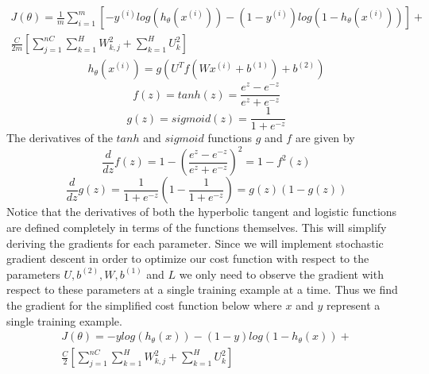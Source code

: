 \documentclass{article}
\begin{document}
\begin{equation}
\begin{split}
J(\theta) = \frac{1}{m} \sum_{i=1}^m \left[-y ^{(i)} log(h_{\theta}(x^{(i)}))-(1-y^{(i)})log(1-h_{\theta}(x^{(i)}))\right]+\\ \frac{C}{2m} \left[ \sum_{j=1}^{nC} \sum_{k=1}^H W_{k,j}^2 + \sum_{k=1}^H U_{k}^2\right]
\end{split}
\end{equation}
\begin{equation}
\begin{split}
h_{\theta}(x^{(i)}) = g\left(U^Tf\left(Wx^{(i)}+b^{(1)}\right)+b^{(2)}\right)
\end{split}
\end{equation}
\begin{equation}
f(z) = tanh(z) = \frac{e^z - e^{-z}}{e^z + e^{-z}}
\end{equation}
\begin{equation}
g(z) = sigmoid(z) = \frac{1}{1+e^{-z}}
\end{equation}
The derivatives of the \(tanh\) and \(sigmoid\) functions \(g\) and \(f\) are given by
\begin{equation}\label{tanhderiv}
\frac{d}{dz}f(z) = 1 - \left(\frac{e^z-e^{-z}}{e^z+e^{-z}}\right)^2 = 1- f^2(z)
\end{equation}
\begin{equation}\label{sigderiv}
\frac{d}{dz}g(z) = \frac{1}{1+e^{-z}}\left(1 - \frac{1}{1+e^{-z}}\right) = g(z)(1-g(z))
\end{equation}
Notice that the derivatives of both the hyperbolic tangent and logistic functions are defined completely in terms of the functions themselves.  This will simplify deriving the gradients for each parameter.  Since we will implement stochastic gradient descent in order to optimize our cost function with respect to the parameters \(U, b^{(2)}, W, b^{(1)}\) and \(L\) we only need to observe the gradient with respect to these parameters at a single training example at a time.  Thus we find the gradient for the simplified cost function below where \(x\) and \(y\) represent a single training example.
\begin{equation}\label{cost}
\begin{split}
J(\theta) = -ylog(h_{\theta}(x))-(1-y)log(1-h_{\theta}(x))+\\ \frac{C}{2} \left[ \sum_{j=1}^{nC} \sum_{k=1}^H W_{k,j}^2 + \sum_{k=1}^H U_{k}^2\right]
\end{split}
\end{equation}
\end{document}
